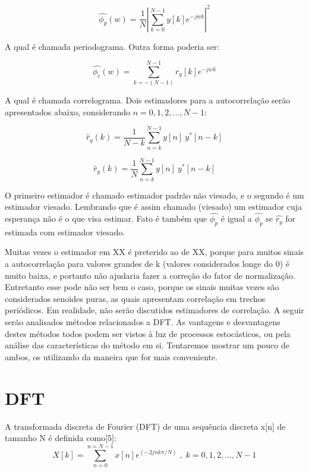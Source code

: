\begin{equation}
\hat{\phi_p}(w)=\frac{1}{N}  \left|\sum_{k=0}^{N-1}y[k]e^{-jwk}  \right|^2
\end{equation}

A qual é chamada periodograma. Outra forma poderia ser:

\begin{equation}
\hat{\phi_c}(w)=\sum_{k=-(N-1)}^{N-1}r_y[k]e^{-jwk}
\end{equation}

A qual é chamada correlograma. Dois estimadores para a autocorrelação serão apresentados abaixo, considerando $n=0,1,2,..., N-1$:

\begin{equation}
\hat{r}_y(k)=\frac{1}{N-k}\sum_{n=k}^{N-1}y[n] \: y^*[n-k]
\end{equation}

\begin{equation}
\hat{r}_y(k)=\frac{1}{N}\sum_{n=k}^{N-1}y[n] \: y^*[n-k]
\end{equation}

O primeiro estimador é chamado estimador padrão não viesado, e o segundo é um estimador viesado. Lembrando que é assim chamado (viesado) um estimador cuja esperança não é o que visa estimar. Fato é também que $\hat{\phi_p}$ é igual a $\hat{\phi_p}$ se $\hat{r_y}$ for estimada com estimador viesado.

\indent Muitas vezes o estimador em XX é preterido ao de XX, porque para muitos sinais a autocorrelação para valores grandes de k (valores considerados longe do 0) é muito baixa, e portanto não ajudaria fazer a correção do fator de normalização. Entretanto esse pode não ser bem o caso, porque os sinais muitas vezes são considerados senoides puras, as quais apresentam correlação em trechos periódicos. Em realidade, não serão discutidos estimadores de correlação. A seguir serão analisados métodos relacionados a DFT. As vantagens e desvantagens destes métodos todos podem ser vistos à luz de processos estocásticos, ou pela análise das características do método em si. Tentaremos mostrar um pouco de ambos, os utilizando da maneira que for mais conveniente. 
\section{DFT}
A transformada discreta de Fourier (DFT) de uma sequência discreta {x[n]} de tamanho N é definida como[5]:
\begin{equation}
X[k]=\sum_{n=0}^{n=N-1} x[n]e^{(-2jnk\pi/N)}\;,\;k=0,1,2,...,N-1
\end{equation}

